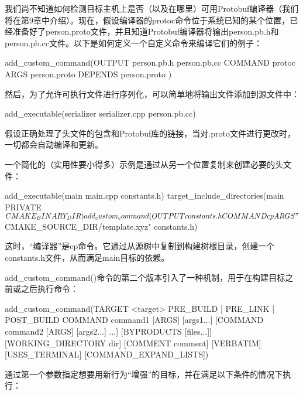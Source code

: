 我们尚不知道如何检测目标主机上是否（以及在哪里）可用Protobuf编译器（我们将在第9章中介绍）。现在，假设编译器的protoc命令位于系统已知的某个位置，已经准备好了person.proto文件，并且知道Protobuf编译器将输出person.pb.h和person.pb.cc文件。以下是如何定义一个自定义命令来编译它们的例子：

\begin{cmake}
add_custom_command(OUTPUT person.pb.h person.pb.cc
        COMMAND protoc ARGS person.proto
        DEPENDS person.proto
)
\end{cmake}

然后，为了允许可执行文件进行序列化，可以简单地将输出文件添加到源文件中：

\begin{cmake}
add_executable(serializer serializer.cpp person.pb.cc)
\end{cmake}

假设正确处理了头文件的包含和Protobuf库的链接，当对.proto文件进行更改时，一切都会自动编译和更新。

一个简化的（实用性要小得多）示例是通过从另一个位置复制来创建必要的头文件：


\begin{cmake}
add_executable(main main.cpp constants.h)
target_include_directories(main PRIVATE ${CMAKE_BINARY_DIR})
add_custom_command(OUTPUT constants.h COMMAND cp
                   ARGS "${CMAKE_SOURCE_DIR}/template.xyz" constants.h)
\end{cmake}

这时，“编译器”是cp命令。它通过从源树中复制到构建树根目录，创建一个constants.h文件，从而满足main目标的依赖。


add\_custom\_command()命令的第二个版本引入了一种机制，用于在构建目标之前或之后执行命令：

\begin{cmake}
add_custom_command(TARGET <target>
                   PRE_BUILD | PRE_LINK | POST_BUILD
                   COMMAND command1 [ARGS] [args1...]
                   [COMMAND command2 [ARGS] [args2...] ...]
                   [BYPRODUCTS [files...]]
                   [WORKING_DIRECTORY dir]
                   [COMMENT comment]
                   [VERBATIM] [USES_TERMINAL]
                   [COMMAND_EXPAND_LISTS])
\end{cmake}

通过第一个参数指定想要用新行为“增强”的目标，并在满足以下条件的情况下执行：

